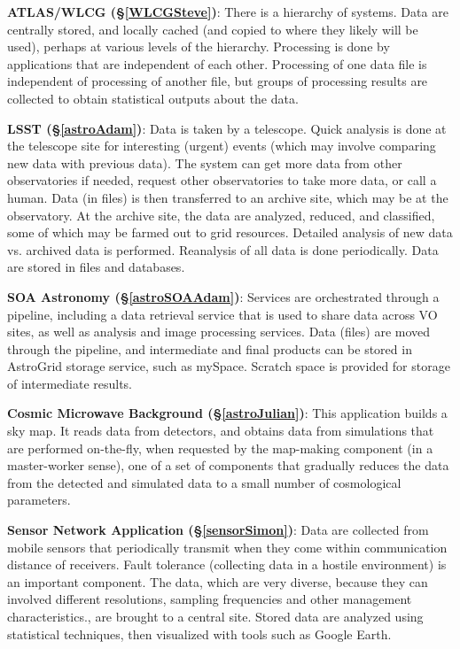 {\bf ATLAS/WLCG (\S\ref{WLCGSteve})}: There is a hierarchy of systems. Data are centrally stored, and locally cached (and copied to where they likely will be used), perhaps at various levels of the hierarchy. Processing is done by applications that are independent of each other. Processing of one data file is independent of processing of another file, but groups of processing results are collected to obtain statistical outputs about the data.

{\bf LSST (\S\ref{astroAdam})}: Data is taken by a telescope. Quick analysis is done at the telescope site for interesting (urgent) events (which may involve comparing new data with previous data).
The system can get more data from other observatories if needed, request other observatories to take more data, or call a human. Data (in files) is then transferred to an archive site, which may be at the observatory. At the archive site, the data are analyzed, reduced, and classified, some of which may be farmed out to grid resources.  Detailed analysis of new data vs. archived data is performed.  Reanalysis of all data is done periodically.  Data are stored in files and databases.

{\bf SOA Astronomy (\S\ref{astroSOAAdam})}: Services are orchestrated through a pipeline, including a data retrieval service that is used to share data across VO sites, as well as analysis and image processing services.  Data (files) are moved through the pipeline, and intermediate and final products can be stored in AstroGrid storage service, such as mySpace.  Scratch space is provided for storage of intermediate results.

{\bf Cosmic Microwave Background (\S\ref{astroJulian})}: This application builds a sky map.  It reads data from detectors, and obtains data from simulations that are performed on-the-fly, when requested by the map-making component (in a master-worker sense), one of a set of components that gradually reduces the data from the detected and simulated data to a small number of cosmological parameters.

{\bf Sensor Network Application (\S\ref{sensorSimon})}: Data are collected from mobile sensors that periodically transmit when they come within communication distance of receivers. Fault tolerance (collecting data in a hostile environment) is an important component. The data, which are very diverse, because they can involved different resolutions, sampling frequencies and other management characteristics., are brought to a central site. Stored data are analyzed using statistical techniques, then visualized with tools such as Google Earth.

